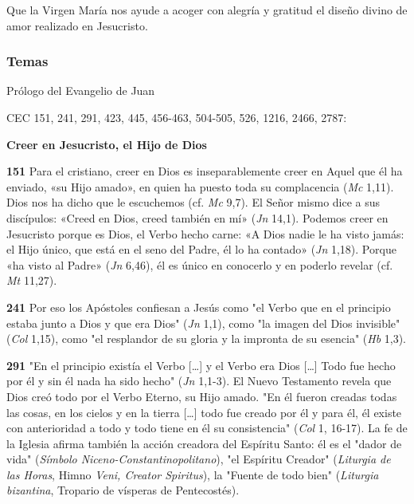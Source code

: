 \documentclass[]{article}
\begin{document}
Que la Virgen María nos ayude a acoger con alegría y gratitud el diseño
divino de amor realizado en
Jesucristo.\protect\hypertarget{_Ref448598876}{}{\protect\hypertarget{_Toc448662858}{}{\protect\hypertarget{_Toc448690377}{}{}}}



\subsubsection{Temas}\label{temas-10}

Prólogo del Evangelio de Juan

CEC 151, 241, 291, 423, 445, 456-463, 504-505, 526, 1216, 2466, 2787:

\textbf{Creer en Jesucristo, el Hijo de Dios}

\textbf{151} Para el cristiano, creer en Dios es inseparablemente creer
en Aquel que él ha enviado, «su Hijo amado», en quien ha puesto toda su
complacencia (\emph{Mc} 1,11). Dios nos ha dicho que le escuchemos (cf.
\emph{Mc} 9,7). El Señor mismo dice a sus discípulos: «Creed en Dios,
creed también en mí» (\emph{Jn} 14,1). Podemos creer en Jesucristo
porque es Dios, el Verbo hecho carne: «A Dios nadie le ha visto jamás:
el Hijo único, que está en el seno del Padre, él lo ha contado»
(\emph{Jn} 1,18). Porque «ha visto al Padre» (\emph{Jn} 6,46), él es
único en conocerlo y en poderlo revelar (cf. \emph{Mt} 11,27).

\textbf{241} Por eso los Apóstoles confiesan a Jesús como "el Verbo que
en el principio estaba junto a Dios y que era Dios" (\emph{Jn} 1,1),
como "la imagen del Dios invisible" (\emph{Col} 1,15), como "el
resplandor de su gloria y la impronta de su esencia" (\emph{Hb} 1,3).

\textbf{291} "En el principio existía el Verbo [\ldots{}] y el Verbo era
Dios [\ldots{}] Todo fue hecho por él y sin él nada ha sido hecho"
(\emph{Jn} 1,1-3). El Nuevo Testamento revela que Dios creó todo por el
Verbo Eterno, su Hijo amado. "En él fueron creadas todas las cosas, en
los cielos y en la tierra [\ldots{}] todo fue creado por él y para él, él
existe con anterioridad a todo y todo tiene en él su consistencia"
(\emph{Col} 1, 16-17). La fe de la Iglesia afirma también la acción
creadora del Espíritu Santo: él es el "dador de vida" (\emph{Símbolo
Niceno-Constantinopolitano}), "el Espíritu Creador" (\emph{Liturgia de
las Horas}, Himno \emph{Veni, Creator Spiritus}), la "Fuente de todo
bien" (\emph{Liturgia bizantina}, Tropario de vísperas de Pentecostés).
\end{document}
